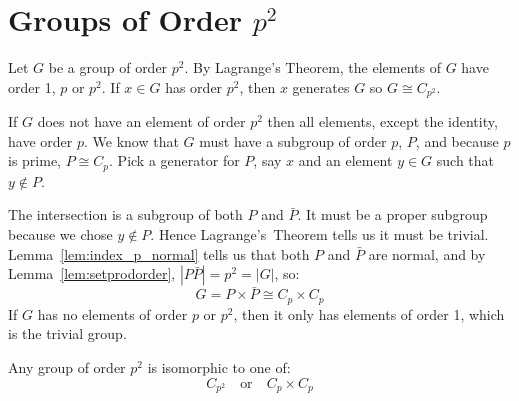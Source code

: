 \section{Groups of Order \(p^2\)}
Let \(G\) be a group of order \(p^2\).
By Lagrange's Theorem, the elements of \(G\) have order 1, \(p\) or \(p^2\).
If \(x \in G\) has order \(p^2\), then \(x\) generates \(G\) so \(G \cong C_{p^2}\).

If \(G\) does not have an element of order \(p^2\) then all elements, except the identity, have order \(p\).
We know that \(G\) must have a subgroup of order \(p\), \(P\), and because \(p\) is prime, \(P \cong C_p\).
Pick a generator for \(P\), say \(x\) and an element \(y \in G\) such that \(y \notin P\).

The intersection is a subgroup of both \(P\) and \(\bar{P}\).
It must be a proper subgroup because we chose \(y \notin P\).
Hence Lagrange's~Theorem tells us it must be trivial.
Lemma~\ref{lem:index_p_normal} tells us that both \(P\) and \(\bar{P}\) are normal, and by Lemma~\ref{lem:setprodorder},
\(|P\bar{P}| = p^2 = |G|\), so:
\[G = P \times \bar{P} \cong C_p \times C_p\]
If \(G\) has no elements of order \(p\) or \(p^2\), then it only has elements of order 1, which is the trivial group.

\begin{mdframed}[align=center,nobreak=true]
    \begin{center}
        Any group of order \(p^2\) is isomorphic to one of:
        \[C_{p^2} \quad \text{or} \quad C_p \times C_p\]
    \end{center}
\end{mdframed}
